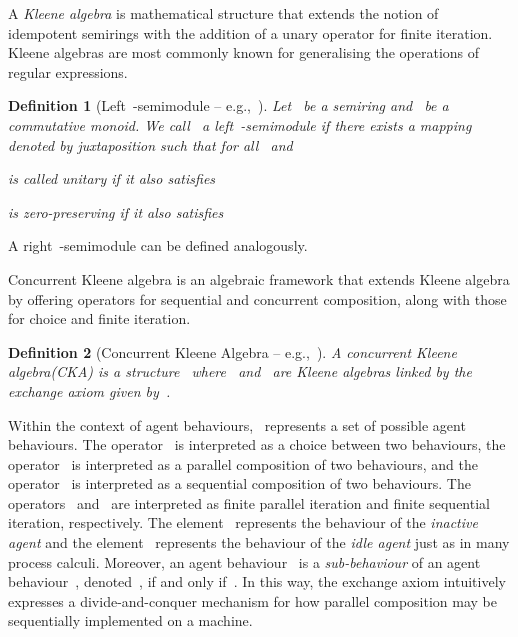 \documentclass[copyright,creativecommons]{eptcs}
\makeatletter
\newcommand{\eg}{\textrm{e.g.,}\@\xspace}
\newcommand{\KA}{Kleene algebra\@\xspace}
\newcommand{\CKA}{concurrent Kleene algebra\@\xspace}
\newcommand{\CKAabbrv}{CKA\@\xspace}
\newcommand{\stim}{{\cal S}}
\newcommand{\rightSemimodule}[1]{right~-semimodule\@\xspace}
\newcommand{\leftSemimodule}[1]{left~-semimodule\@\xspace}
\newcommand{\LeftSemimodule}[1]{Left~-semimodule\@\xspace}
\newtheorem{definition}{Definition}
\makeatother
\begin{document}
A \emph{\KA} is mathematical structure that extends the notion of idempotent semirings with the addition of a unary operator for finite iteration. Kleene algebras are most commonly known for generalising the operations of regular expressions.

\begin{definition}[\LeftSemimodule{\stim} -- \eg~\cite{Hebisch1993aa}]
\label{def:semimodule}
	Let~ be a semiring and~ be a commutative monoid. We call~ a \emph{\leftSemimodule{\stim}} if there exists a mapping~ denoted by juxtaposition such that for all~ and~
	\begin{enumerate}[(i)]
		\begin{minipage}[t]{0.4\linewidth}   
			\item \label{def:SM_dist_Kplus}
				
			\item \label{def:SM_dist_Splus}
				
			\item \label{def:SM_assoc_seq}
				
		\end{minipage}
	  	\begin{minipage}[t]{0.6\linewidth}
			\item \label{def:SM_id}
				 is called \emph{unitary} if it also satisfies~
			\item \label{def:SM_zero}
				 is \emph{zero-preserving} if it also satisfies~
			\textcolor{white}{\item}      
	  	\end{minipage}
	\end{enumerate}
\end{definition}

A \rightSemimodule{\stim} can be defined analogously. 

Concurrent Kleene algebra is an algebraic framework that extends \KA by offering operators for sequential and concurrent composition, along with those for choice and finite iteration. 

\begin{definition}[Concurrent Kleene Algebra -- \eg~\cite{Hoare2009aa}]
\label{def:CKA}
	A \emph{\CKA (\CKAabbrv)} is a structure~ where~ and~ are Kleene algebras linked by the \emph{exchange axiom} given by~.
\end{definition}

Within the context of agent behaviours,~ represents a set of possible agent behaviours. The operator~ is interpreted as a choice between two behaviours, the operator~ is interpreted as a parallel composition of two behaviours, and the operator~ is interpreted as a sequential composition of two behaviours. The operators~ and~ are interpreted as finite parallel iteration and finite sequential iteration, respectively. The element~ represents the behaviour of the \emph{inactive agent} and the element~ represents the behaviour of the \emph{idle agent} just as in many process calculi. Moreover, an agent behaviour~ is a \emph{sub-behaviour} of an agent behaviour~, denoted~, if and only if~. In this way, the exchange axiom intuitively expresses a divide-and-conquer mechanism for how parallel composition may be sequentially implemented on a machine.
\end{document}
